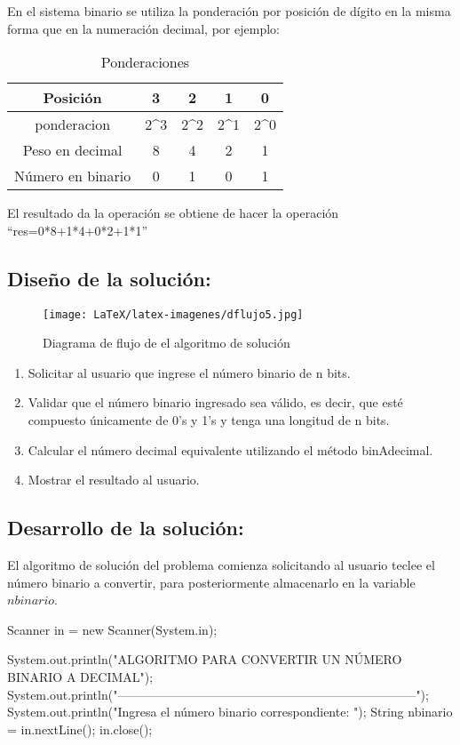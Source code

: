 En el sistema binario se utiliza la ponderación por posición de dígito en la misma forma que en la numeración decimal, por ejemplo:

\begin{table}[h!]
     \centering
     \caption{Ponderaciones}
     
     \begin{tabular}{|c|c|c|c|c|}
     \hline
        Posición & 3 & 2 & 1 & 0 \\
        \hline
        ponderacion  & 2^{3} & 2^{2} & 2^{1} & 2^{0} \\
        \hline
        Peso en decimal  & 8 & 4 & 2 & 1 \\
        \hline
        Número en binario  & 0 & 1 & 0 & 1 \\
        \hline
     \end{tabular}
     \label{tab:my_label}
 \end{table}

El resultado da la operación se obtiene de hacer la operación “res=0*8+1*4+0*2+1*1”

\subsection{\textbf{Diseño de la solución:}}

\begin{figure}[h!]
    \centering
    \texttt{[image: LaTeX/latex-imagenes/dflujo5.jpg]}
    \caption{Diagrama de flujo de el algoritmo de solución}
    \label{}
\end{figure}

\begin{enumerate}
    \item Solicitar al usuario que ingrese el número binario de n bits.
    \item Validar que el número binario ingresado sea válido, es decir, que esté compuesto únicamente de 0's y 1's y tenga una longitud de n bits.
    \item Calcular el número decimal equivalente utilizando el método binAdecimal.
    \item Mostrar el resultado al usuario.
\end{enumerate}

\subsection{\textbf{Desarrollo de la solución:}}

El algoritmo de solución del problema comienza solicitando al usuario teclee el número binario a convertir, para posteriormente almacenarlo en la variable $nbinario$.
\begin{javaCode}

Scanner in = new Scanner(System.in);
        
    System.out.println("ALGORITMO PARA CONVERTIR UN NÚMERO BINARIO A DECIMAL");
    System.out.println("------------------------------------------------------------------------");
    System.out.println("Ingresa el número binario correspondiente: ");
    String nbinario = in.nextLine();
    in.close();
        
\end{javaCode}

